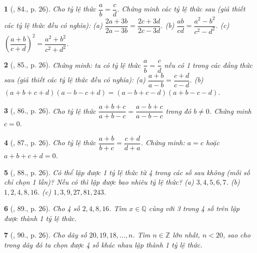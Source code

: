 \documentclass{article}
\newtheorem{baitoan}{}
\begin{document}
\begin{baitoan}[\cite{Binh_Toan_7_tap_1}, 84., p. 26]
	Cho tỷ lệ thức $\dfrac{a}{b} = \dfrac{c}{d}$. Chứng minh các tỷ lệ thức sau (giả thiết các tỷ lệ thức đều có nghĩa): (a) $\dfrac{2a + 3b}{2a - 3b} = \dfrac{2c + 3d}{2c - 3d}$. (b) $\dfrac{ab}{cd} = \dfrac{a^2 - b^2}{c^2 - d^2}$. (c) $\left(\dfrac{a + b}{c + d}\right)^2 = \dfrac{a^2 + b^2}{c^2 + d^2}$.	
\end{baitoan}

\begin{baitoan}[\cite{Binh_Toan_7_tap_1}, 85., p. 26]
	Chứng minh: ta có tỷ lệ thức $\dfrac{a}{b} = \dfrac{c}{d}$ nếu có 1 trong các đẳng thức sau (giả thiết các tỷ lệ thức đều có nghĩa): (a) $\dfrac{a + b}{a - b} = \dfrac{c + d}{c - d}$. (b) $(a + b + c + d)(a - b - c + d) = (a - b + c - d)(a + b - c - d)$.	
\end{baitoan}

\begin{baitoan}[\cite{Binh_Toan_7_tap_1}, 86., p. 26]
	Cho tỷ lệ thức $\dfrac{a + b + c}{a + b - c} = \dfrac{a - b + c}{a - b - c}$ trong đó $b\ne 0$. Chứng minh $c = 0$.
\end{baitoan}

\begin{baitoan}[\cite{Binh_Toan_7_tap_1}, 87., p. 26]
	Cho tỷ lệ thức $\dfrac{a + b}{b + c} = \dfrac{c + d}{d + a}$. Chứng minh: $a = c$ hoặc $a + b + c + d = 0$.
\end{baitoan}

\begin{baitoan}[\cite{Binh_Toan_7_tap_1}, 88., p. 26]
	Có thể lập được 1 tỷ lệ thức từ 4 trong các số sau không (mỗi số chỉ chọn 1 lần)? Nếu có thì lập được bao nhiêu tỷ lệ thức? (a) $3,4,5,6,7$. (b) $1,2,4,8,16$. (c) $1,3,9,27,81,243$.	
\end{baitoan}

\begin{baitoan}[\cite{Binh_Toan_7_tap_1}, 89., p. 26]
	Cho 4 số $2,4,8,16$. Tìm $x\in\mathbb{Q}$ cùng với 3 trong 4 số trên lập được thành 1 tỷ lệ thức.
\end{baitoan}

\begin{baitoan}[\cite{Binh_Toan_7_tap_1}, 90., p. 26]
	Cho dãy số $20,19,18,\ldots,n$. Tìm $n\in\mathbb{Z}$ lớn nhất, $n < 20$, sao cho trong dãy đó ta chọn được 4 số khác nhau lập thành 1 tỷ lệ thức.
\end{baitoan}

\end{document}
